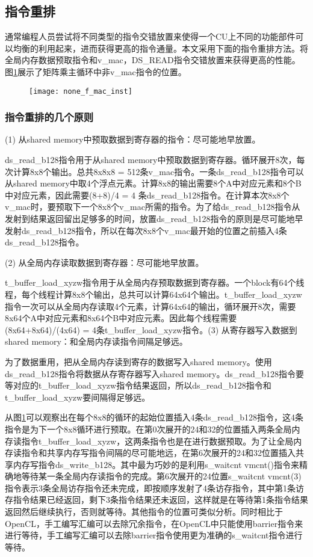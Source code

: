 \subsection{指令重排}
通常编程人员尝试将不同类型的指令交错放置来使得一个CU上不同的功能部件可以均衡的利用起来，进而获得更高的指令通量。本文采用下面的指令重排方法。将全局内存数据预取指令和v\_mac，DS\_READ指令交错放置来获得更高的性能。图\ref{fig:none_f_mac_inst}展示了矩阵乘主循环中非v\_mac指令的位置。
\begin{figure}[htbp]
	\centering
	\texttt{[image: none\_f\_mac\_inst]}
	\label{fig:none_f_mac_inst}
\end{figure}
\subsubsection{指令重排的几个原则}
(1) 从shared memory中预取数据到寄存器的指令：尽可能地早放置。

ds\_read\_b128指令用于从shared memory中预取数据到寄存器。循环展开8次，每次计算8x8个输出。总共8x8x8 = 512条v\_mac指令。一条ds\_read\_b128指令可以从shared memory中取4个浮点元素。计算8x8的输出需要8个A中对应元素和8个B中对应元素，因此需要(8+8)/4 = 4 条ds\_read\_b128指令。在计算本次8x8个v\_mac时，要预取下一个8x8个v\_mac所需的指令。为了给ds\_read\_b128指令从发射到结果返回留出足够多的时间，放置ds\_read\_b128指令的原则是尽可能地早发射ds\_read\_b128指令，所以在每次8x8个v\_mac最开始的位置之前插入4条ds\_read\_b128指令。

(2) 从全局内存读取数据到寄存器：尽可能地早放置。

t\_buffer\_load\_xyzw指令用于从全局内存预取数据到寄存器。一个block有64个线程，每个线程计算8x8个输出，总共可以计算64x64个输出。t\_buffer\_load\_xyzw指令一次可以从全局内存读取4个元素，计算64x64的输出，循环展开8次，需要8x64个A中对应元素和8x64个B中对应元素。因此每个线程需要(8x64+8x64)/(4x64) = 4条t\_buffer\_load\_xyzw指令。(3) 从寄存器写入数据到shared memory：和全局内存读指令间隔足够远。

为了数据重用，把从全局内存读到寄存的数据写入shared memory。使用ds\_read\_b128指令将数据从存寄存器写入shared memory。ds\_read\_b128指令要等对应的t\_buffer\_load\_xyzw指令结果返回，所以ds\_read\_b128指令和t\_buffer\_load\_xyzw要间隔得足够远。

从图\ref{fig:none_f_mac_inst}可以观察出在每个8x8的循环的起始位置插入4条ds\_read\_b128指令，这4条指令是为下一个8x8循环进行预取。在第0次展开的24和32的位置插入两条全局内存读指令t\_buffer\_load\_xyzw，这两条指令也是在进行数据预取。为了让全局内存读指令和共享内存写指令间隔的尽可能地远，在第6次展开的24和32位置插入共享内存写指令ds\_write\_b128。其中最为巧妙的是利用s\_waitcnt vmcnt()指令来精确地等待某一条全局内存读指令的完成。第6次展开的24位置s\_waitcnt vmcnt(3)指令表示3条全局访存指令还未完成，即按顺序发射了4条访存指令，其中第1条访存指令结果已经返回，剩下3条指令结果还未返回，这样就是在等待第1条指令结果返回然后继续执行，否则就等待。其他指令的位置可类似分析。同时相比于OpenCL，手工编写汇编可以去除冗余指令，在OpenCL中只能使用barrier指令来进行等待，手工编写汇编可以去除barrier指令使用更为准确的s\_waitcnt指令进行等待。


